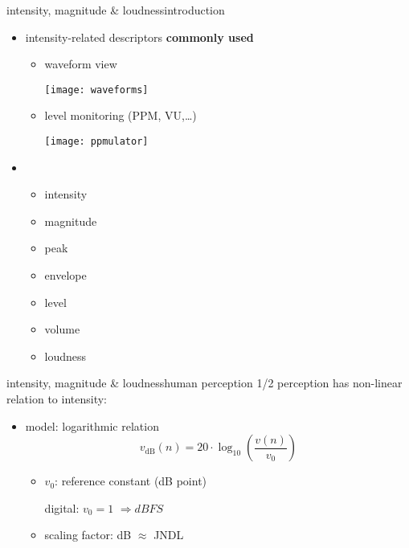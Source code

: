         \begin{frame}{intensity, magnitude \& loudness}{introduction}
            \begin{itemize}
                \item   intensity-related descriptors \textbf{commonly used}
                    \begin{itemize}
                        \item	waveform view
                        
                            \texttt{[image: waveforms]}
                        \item	level monitoring (PPM, VU,\ldots)
                        
                            \texttt{[image: ppmulator]}
                     \end{itemize}
            \end{itemize}
            
            \vspace{-3mm}
            \begin{itemize}
                \item[]<2-> 
                \vspace{-3mm}
                 \begin{itemize}
                    \item	intensity
                    \item	magnitude
                    \item	peak
                    \item	envelope
                    \item	level
                    \item	volume
                    \item	loudness
                 \end{itemize}
            \end{itemize}
            
                \vspace{-3mm}
        \end{frame}
	
	\begin{frame}{intensity, magnitude \& loudness}{human perception 1/2}
		perception has non-linear relation to intensity:
		\begin{itemize}
			\item	model: logarithmic relation
				\begin{equation}
					v_\mathrm{dB}(n) = 20\cdot\log_{10}\left(\frac{v(n)}{v_0}\right)
				\end{equation}
	
				\pause
				\begin{itemize}
					\item	$v_0$: reference constant (\unit[0]{dB} point)
					
							digital: $v_0 = 1$ $\Rightarrow \unit{dBFS}$
					\pause
					\item	scaling	factor: \unit[1]{dB} $\approx$ JNDL
				\end{itemize}
		\end{itemize}
	\end{frame}
	
